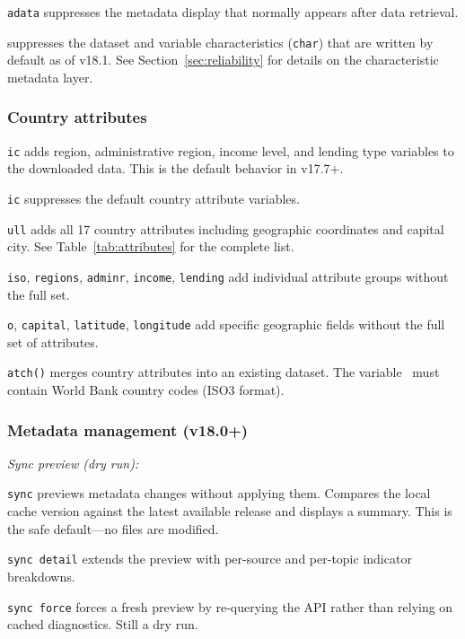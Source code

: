 \documentclass[bib]{statapress}
\begin{document}
\hangpara
\texttt{adata} suppresses the metadata display that normally appears after data retrieval.

\hangpara
\texttt{} suppresses the dataset and variable characteristics
(\texttt{char}) that are written by default as of v18.1. See
Section~\ref{sec:reliability} for details on the characteristic metadata layer.

\subsubsection*{Country attributes}

\hangpara
\texttt{ic} adds region, administrative region, income level, and lending type variables to the downloaded data. This is the default behavior in v17.7+.

\hangpara
\texttt{ic} suppresses the default country attribute variables.

\hangpara
\texttt{ull} adds all 17 country attributes including geographic coordinates and capital city. See Table~\ref{tab:attributes} for the complete list.

\hangpara
\texttt{iso}, \texttt{regions}, \texttt{adminr}, \texttt{income},
\texttt{lending} add individual attribute groups without the full set.

\hangpara
\texttt{o}, \texttt{capital}, \texttt{latitude}, \texttt{longitude} add specific geographic fields without the full set of attributes.

\hangpara
\texttt{atch(\varname)} merges country attributes into an existing dataset. The variable \varname\ must contain World Bank country codes (ISO3 format).

\subsubsection*{Metadata management (v18.0+)}

\noindent\textit{Sync preview (dry run):}

\hangpara
\texttt{sync} previews metadata changes without applying them. Compares the
local cache version against the latest available release and displays a
summary. This is the safe default---no files are modified.

\hangpara
\texttt{sync detail} extends the preview with per-source and per-topic
indicator breakdowns.

\hangpara
\texttt{sync force} forces a fresh preview by re-querying the API rather
than relying on cached diagnostics. Still a dry run.
\end{document}
